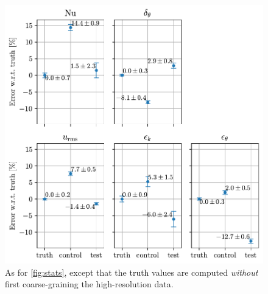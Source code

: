 \documentclass[../main.tex]{subfiles}
\begin{document}

\begin{figure}[ht]
    \centering
    \includegraphics[width=0.6\linewidth]{figures/stats_vs_fine.pdf}
    \caption{
        As for \cref{fig:stats}, except that the truth values are computed
        \emph{without} first coarse-graining the high-resolution data.
    }
    \label{fig:stats_vs_fine}
\end{figure}

\ifSubfilesClassLoaded{%
    \emergencystretch=5em
    \printbibliography{}
}{}
\end{document}

